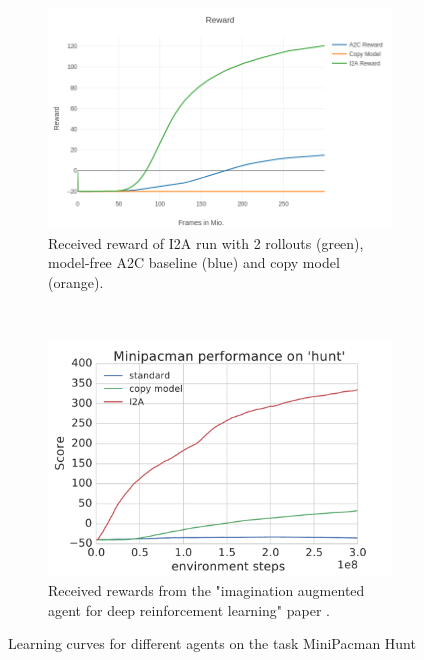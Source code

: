 \begin{figure}[H] 
    \centering
    \begin{subfigure}[b]{0.45\textwidth}
        \includegraphics[width=\textwidth]{./Images/hunt_rewards_compare.png}
  		\caption{Received reward of I2A run with 2 rollouts (green), model-free A2C baseline (blue) and copy model (orange).} 
  		\label{fig:mini_pacman_hunt_rewards} 
    \end{subfigure}
	~ %
    \begin{subfigure}[b]{0.45\textwidth}
         \includegraphics[width=\textwidth]{./Images/minipacman_ghosthunt.pdf}
		 \caption{Received rewards from the "imagination augmented agent for deep reinforcement learning" paper \cite{I2A}.} 
		\label{fig:mini_pacman_hunt_original_rewards} 
    \end{subfigure}
    
    \caption{Learning curves for different agents on the task MiniPacman Hunt}\label{fig:mini_pacman_hunt}
\end{figure}

